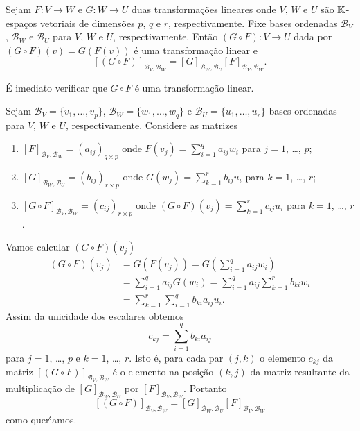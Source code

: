 \begin{teorema}\label{matriz_da_composicao_de_transformacoes}
	Sejam $F : V \to W$ e $G : W \to U$ duas transforma\c{c}\~oes lineares onde $V$, $W$ e $U$ s\~ao $\mathbb{K}$-espa\c{c}os vetoriais de dimens\~oes $p$, $q$ e $r$, respectivamente. Fixe bases ordenadas $\mathcal{B}_V$, $\mathcal{B}_W$ e $\mathcal{B}_U$ para $V$, $W$ e $U$, respectivamente. Ent\~ao $(G \circ F) : V \to U$ dada por $(G\circ F)(v) = G(F(v))$ \'e uma transforma\c{c}\~ao linear e
	\[
		[(G \circ F)]_{{\mathcal{B}_V},{\mathcal{B}_W}} = [G]_{{\mathcal{B}_W},{\mathcal{B}_U}}[F]_{{\mathcal{B}_V},{\mathcal{B}_W}}.
	\]
\end{teorema}
\begin{prova}
	\'E imediato verificar que $G\circ F$ \'e uma transforma\c{c}\~ao linear.

	Sejam $\mathcal{B}_V = \{v_1,\dots,v_p\}$, $\mathcal{B}_W = \{w_1,\dots,w_q\}$ e $\mathcal{B}_U = \{u_1,\dots,u_r\}$ bases ordenadas para $V$, $W$ e $U$, respectivamente. Considere as matrizes
	\begin{enumerate}
		\item $[F]_{{\mathcal{B}_V},{\mathcal{B}_W}} = (a_{ij})_{q\times p}$ onde $F(v_j) = \sum_{i=1}^qa_{ij}w_i$ para $j=1$, \dots, $p$;

		\item $[G]_{{\mathcal{B}_W},{\mathcal{B}_U}} = (b_{ij})_{r\times p}$ onde $G(w_j) = \sum_{k=1}^rb_{ij}u_i$ para $k=1$, \dots, $r$;

		\item $[G \circ F]_{{\mathcal{B}_V},{\mathcal{B}_W}} = (c_{ij})_{r\times p}$ onde $(G\circ F)(v_j) = \sum_{k=1}^rc_{ij}u_i$ para $k=1$, \dots, $r$.
	\end{enumerate}

	Vamos calcular $(G\circ F)(v_j)$
	\begin{align*}
		(G\circ F)(v_j) &= G(F(v_j)) = G(\sum_{i=1}^qa_{ij}w_i)\\
		&= \sum_{i=1}^qa_{ij}G(w_i) = \sum_{i=1}^qa_{ij}\sum_{k=1}^rb_{ki}w_i\\
		&= \sum_{k=1}^r\sum_{i=1}^qb_{ki}a_{ij}u_i.
	\end{align*}
	Assim da unicidade dos escalares obtemos
	\[
		c_{kj} = \sum_{i=1}^qb_{ki}a_{ij}
	\]
	para $j=1$, \dots, $p$ e $k = 1$, \dots, $r$. Isto \'e, para cada par $(j,k)$ o elemento $c_{kj}$ da matriz $[(G\circ F)]_{{\mathcal{B}_V},{\mathcal{B}_W}}$ \'e o elemento na posi\c{c}\~ao $(k,j)$ da matriz resultante da multiplica\c{c}\~ao de $[G]_{{\mathcal{B}_W},{\mathcal{B}_U}}$ por $[F]_{{\mathcal{B}_V},{\mathcal{B}_W}}$. Portanto
	\[
		[(G\circ F)]_{{\mathcal{B}_V},{\mathcal{B}_W}} = [G]_{{\mathcal{B}_W},{\mathcal{B}_U}}[F]_{{\mathcal{B}_V},{\mathcal{B}_W}}
	\]
	como quer{\'\i}amos.
\end{prova}

